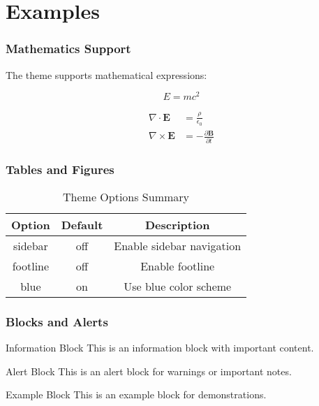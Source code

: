 \section{Examples}

\begin{frame}
	\frametitle{Mathematics Support}
	The theme supports mathematical expressions:
	
	\begin{equation}
		E = mc^2
	\end{equation}
	
	\begin{align}
		\nabla \cdot \mathbf{E} &= \frac{\rho}{\epsilon_0} \\
		\nabla \times \mathbf{E} &= -\frac{\partial \mathbf{B}}{\partial t}
	\end{align}
\end{frame}

\begin{frame}
	\frametitle{Tables and Figures}
	\begin{table}
		\centering
		\begin{tabular}{|c|c|c|}
			\hline
			\textbf{Option} & \textbf{Default} & \textbf{Description} \\
			\hline
			sidebar & off & Enable sidebar navigation \\
			footline & off & Enable footline \\
			blue & on & Use blue color scheme \\
			\hline
		\end{tabular}
		\caption{Theme Options Summary}
	\end{table}
\end{frame}

\begin{frame}
	\frametitle{Blocks and Alerts}
	\begin{block}{Information Block}
		This is an information block with important content.
	\end{block}
	
	\begin{alertblock}{Alert Block}
		This is an alert block for warnings or important notes.
	\end{alertblock}
	
	\begin{exampleblock}{Example Block}
		This is an example block for demonstrations.
	\end{exampleblock}
\end{frame} 